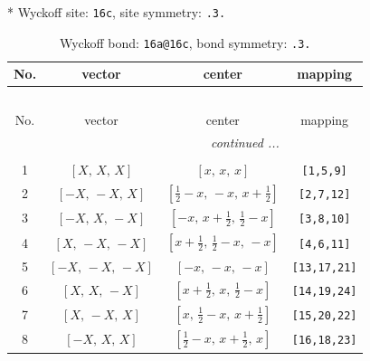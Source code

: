 \documentclass[fleqn,8pt]{jsarticle}
\begin{document}
* Wyckoff site: {\tt 16c}, site symmetry: {\tt .3.}
\renewcommand{\arraystretch}{1.2}
\begin{longtable}{cccc}
\caption{Wyckoff bond: {\tt 16a@16c}, bond symmetry: {\tt .3.}}
 \\
 \hline \hline
No. & vector & center & mapping \\ \hline \endfirsthead

\multicolumn{3}{l}{\tablename\ \thetable{}} \\
 \hline \hline
No. & vector & center & mapping \\ \hline \endhead

 \hline \hline
\multicolumn{3}{r}{\footnotesize\it continued ...} \\ \endfoot

 \hline \hline
\multicolumn{3}{r}{} \\ \endlastfoot

1 & $\left[ X,\, X,\, X \right]$ & $\left[ x,\, x,\, x \right]$ & {\tt [1,5,9]} \\ \hline
2 & $\left[ - X,\, - X,\, X \right]$ & $\left[ \frac{1}{2} - x,\, - x,\, x + \frac{1}{2} \right]$ & {\tt [2,7,12]} \\ \hline
3 & $\left[ - X,\, X,\, - X \right]$ & $\left[ - x,\, x + \frac{1}{2},\, \frac{1}{2} - x \right]$ & {\tt [3,8,10]} \\ \hline
4 & $\left[ X,\, - X,\, - X \right]$ & $\left[ x + \frac{1}{2},\, \frac{1}{2} - x,\, - x \right]$ & {\tt [4,6,11]} \\ \hline
5 & $\left[ - X,\, - X,\, - X \right]$ & $\left[ - x,\, - x,\, - x \right]$ & {\tt [13,17,21]} \\ \hline
6 & $\left[ X,\, X,\, - X \right]$ & $\left[ x + \frac{1}{2},\, x,\, \frac{1}{2} - x \right]$ & {\tt [14,19,24]} \\ \hline
7 & $\left[ X,\, - X,\, X \right]$ & $\left[ x,\, \frac{1}{2} - x,\, x + \frac{1}{2} \right]$ & {\tt [15,20,22]} \\ \hline
8 & $\left[ - X,\, X,\, X \right]$ & $\left[ \frac{1}{2} - x,\, x + \frac{1}{2},\, x \right]$ & {\tt [16,18,23]} \\
\end{longtable}
\renewcommand{\arraystretch}{1.2}
\end{document}
